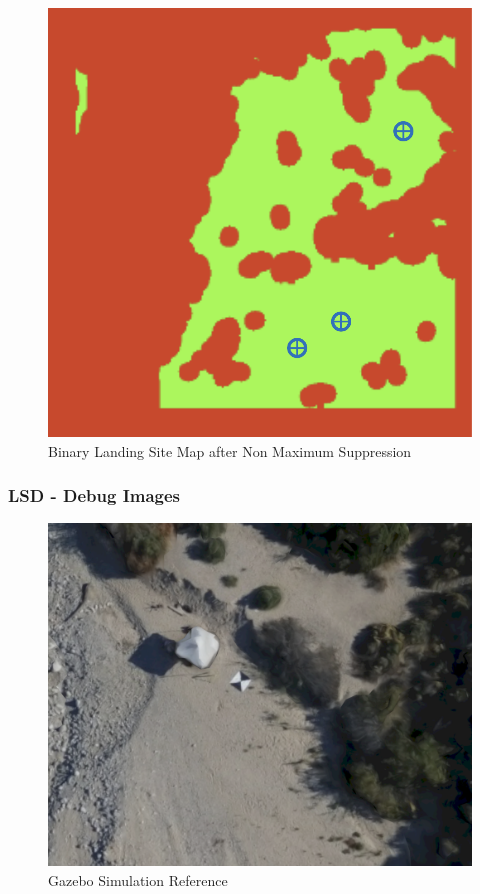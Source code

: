 \begin{figure}[ht!]
    \centering
    \includegraphics[scale=0.5]{images/setup/ls_map_nms.png}
    \caption{Binary Landing Site Map after Non Maximum Suppression}
    \label{fig:ls_map_nps}
\end{figure}

\clearpage %

\subsubsection{LSD - Debug Images}

\begin{figure}[ht!]
    \centering
    \includegraphics[scale=0.25]{images/setup/lsd_debug_reference.png}
    \caption{Gazebo Simulation Reference}
    \label{fig:lsd_debug_ref}
\end{figure}

